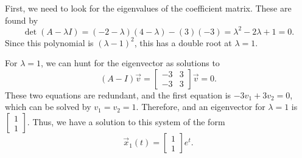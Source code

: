 \begin{exampleSol}
First, we need to look for the eigenvalues of the coefficient matrix. These are found by
\begin{equation*}
\det(A - \lambda I) = (-2-\lambda)(4-\lambda) - (3)(-3) = \lambda^2 - 2\lambda + 1 = 0.
\end{equation*}
Since this polynomial is $(\lambda - 1)^2$, this has a double root at $\lambda = 1$. 

For $\lambda = 1$, we can hunt for the eigenvector as solutions to
\begin{equation*}
(A - I)\vec{v} = \begin{bmatrix} -3 & 3 \\ -3 & 3 \end{bmatrix} \vec{v} = 0.
\end{equation*}
These two equations are redundant, and the first equation is $-3v_1 + 3v_2 = 0$, which can be solved by $v_1 = v_2 = 1$. Therefore, and an eigenvector for $\lambda = 1$ is $\left[ \begin{smallmatrix} 1 \\ 1 \end{smallmatrix} \right]$. Thus, we have a solution to this system of the form
\begin{equation*}
\vec{x}_1(t) = \begin{bmatrix} 1 \\ 1 \end{bmatrix} e^t.
\end{equation*}


\end{exampleSol}
